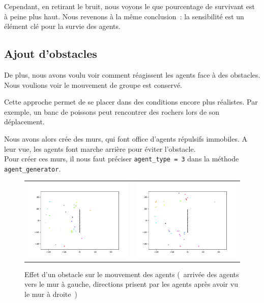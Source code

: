 \documentclass[french, a4paper, 12pt, openany]{report}
\begin{document}
  Cependant, en retirant le bruit, nous voyons le que pourcentage de survivant est à peine plus haut. Nous revenons à la même conclusion~: la sensibilité est un élément clé pour la survie des agents.
  

\subsection{Ajout d'obstacles}

   De plus, nous avons voulu voir comment réagissent les agents face à des obstacles. Nous voulions voir le mouvement de groupe est conservé. 
   
   Cette approche permet de se placer dans des conditions encore plus réalistes. Par exemple, un banc de poissons peut rencontrer des rochers lors de son déplacement. 
   
   Nous avons alors crée des murs, qui font office d'agents répulsifs immobiles. A leur vue, les agents font marche arrière pour éviter l'obstacle. \\
   
   Pour créer ces murs, il nous faut préciser \verb|agent_type = 3| dans la méthode \verb|agent_generator|.\\
   
	\begin{figure}[!h]
		\centering
		\begin{tabular}{cc}
			\includegraphics[width=8cm]{images/image_19.png} & \includegraphics[width=8cm]{images/image_18.png} \\
		\end{tabular}
		\caption{Effet d'un obstacle sur le mouvement des agents (~arrivée des agents vers le mur à gauche, directions prisent par les agents après avoir vu le mur à droite~)}
		\label{obstacles}
	\end{figure}
\end{document}
